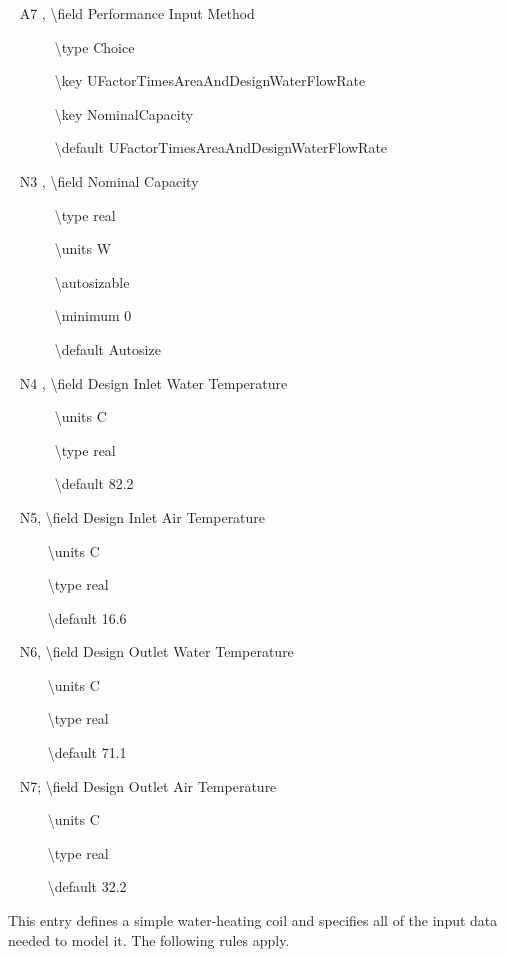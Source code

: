 ~ A7 , \textbackslash{}field Performance Input Method

~~~~~~ \textbackslash{}type Choice

~~~~~~ \textbackslash{}key UFactorTimesAreaAndDesignWaterFlowRate

~~~~~~ \textbackslash{}key NominalCapacity

~~~~~~ \textbackslash{}default UFactorTimesAreaAndDesignWaterFlowRate

~ N3 , \textbackslash{}field Nominal Capacity

~~~~~~ \textbackslash{}type real

~~~~~~ \textbackslash{}units W

~~~~~~ \textbackslash{}autosizable

~~~~~~ \textbackslash{}minimum 0

~~~~~~ \textbackslash{}default Autosize

~ N4 , \textbackslash{}field Design Inlet Water Temperature

~~~~~~ \textbackslash{}units C

~~~~~~ \textbackslash{}type real

~~~~~~ \textbackslash{}default 82.2

~ N5, \textbackslash{}field Design Inlet Air Temperature

~~~~~ \textbackslash{}units C

~~~~~ \textbackslash{}type real

~~~~~ \textbackslash{}default 16.6

~ N6, \textbackslash{}field Design Outlet Water Temperature

~~~~~ \textbackslash{}units C

~~~~~ \textbackslash{}type real

~~~~~ \textbackslash{}default 71.1

~ N7; \textbackslash{}field Design Outlet Air Temperature

~~~~~ \textbackslash{}units C

~~~~~ \textbackslash{}type real

~~~~~ \textbackslash{}default 32.2

This entry defines a simple water-heating coil and specifies all of the input data needed to model it. The following rules apply.


